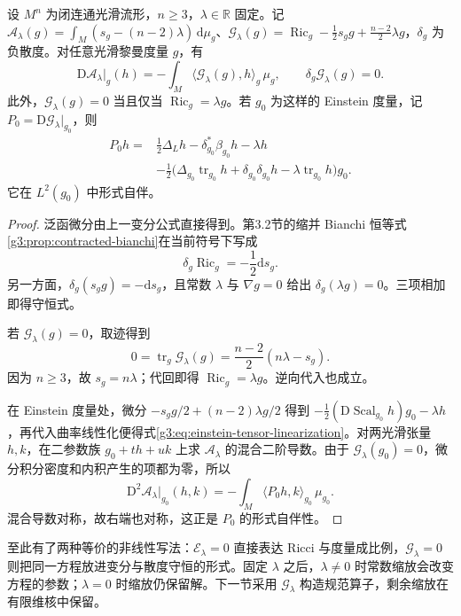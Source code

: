 \begin{proposition}\label{g3:prop:conserved-einstein-tensor}
	设 \(M^n\) 为闭连通光滑流形，\(n\ge3\)，\(\lambda\in\mathbb R\) 固定。记 \(\mathcal A_\lambda(g)=\int_M(s_g-(n-2)\lambda)\,\mathrm d\mu_g\)、\(\mathcal G_\lambda(g)=\operatorname{Ric}_g-\tfrac12s_gg+\tfrac{n-2}2\lambda g\)，\(\delta_g\) 为负散度。对任意光滑黎曼度量 \(g\)，有
	\begin{equation}\label{g3:eq:einstein-tensor-variation-divergence}
		\mathrm D\mathcal A_\lambda|_g(h)=-\int_M\langle\mathcal G_\lambda(g),h\rangle_g\,\mu_g,
		\qquad \delta_g\mathcal G_\lambda(g)=0.
	\end{equation}
	此外，\(\mathcal G_\lambda(g)=0\) 当且仅当 \(\operatorname{Ric}_g=\lambda g\)。若 \(g_0\) 为这样的 Einstein 度量，记 \(P_0=\mathrm D\mathcal G_\lambda|_{g_0}\)，则
	\begin{equation}\label{g3:eq:einstein-tensor-linearization}
		\begin{aligned}
			P_0h={}&\frac12\Delta_Lh-\delta_{g_0}^*\beta_{g_0}h-\lambda h\\
			&-\frac12\bigl(\Delta_{g_0}\operatorname{tr}_{g_0}h+\delta_{g_0}\delta_{g_0}h-\lambda\operatorname{tr}_{g_0}h\bigr)g_0.
		\end{aligned}
	\end{equation}
	它在 \(L^2(g_0)\) 中形式自伴。
\end{proposition}
\begin{proof}
	泛函微分由上一变分公式直接得到。第3.2节的缩并 Bianchi 恒等式\cref{g3:prop:contracted-bianchi}在当前符号下写成
	\[
		\delta_g\operatorname{Ric}_g=-\frac12\mathrm ds_g.
	\]
	另一方面，\(\delta_g(s_gg)=-\mathrm ds_g\)，且常数 \(\lambda\) 与 \(\nabla g=0\) 给出 \(\delta_g(\lambda g)=0\)。三项相加即得守恒式。

	若 \(\mathcal G_\lambda(g)=0\)，取迹得到
	\[
		0=\operatorname{tr}_g\mathcal G_\lambda(g)=\frac{n-2}{2}(n\lambda-s_g).
	\]
	因为 \(n\ge3\)，故 \(s_g=n\lambda\)；代回即得 \(\operatorname{Ric}_g=\lambda g\)。逆向代入也成立。

	在 Einstein 度量处，微分 \(-s_gg/2+(n-2)\lambda g/2\) 得到 \(-\tfrac12(\mathrm D\operatorname{Scal}_{g_0}h)g_0-\lambda h\)，再代入曲率线性化便得式\eqref{g3:eq:einstein-tensor-linearization}。对两光滑张量 \(h,k\)，在二参数族 \(g_0+th+uk\) 上求 \(\mathcal A_\lambda\) 的混合二阶导数。由于 \(\mathcal G_\lambda(g_0)=0\)，微分积分密度和内积产生的项都为零，所以
	\[
		\mathrm D^2\mathcal A_\lambda|_{g_0}(h,k)=-\int_M\langle P_0h,k\rangle_{g_0}\,\mu_{g_0}.
	\]
	混合导数对称，故右端也对称，这正是 \(P_0\) 的形式自伴性。
\end{proof}

至此有了两种等价的非线性写法：\(\mathcal E_\lambda=0\) 直接表达 Ricci 与度量成比例，\(\mathcal G_\lambda=0\) 则把同一方程放进变分与散度守恒的形式。固定 \(\lambda\) 之后，\(\lambda\ne0\) 时常数缩放会改变方程的参数；\(\lambda=0\) 时缩放仍保留解。下一节采用 \(\mathcal G_\lambda\) 构造规范算子，剩余缩放在有限维核中保留。
